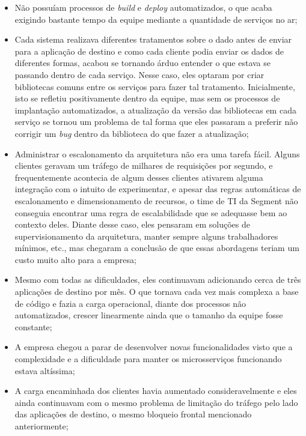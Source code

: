\begin{itemize}
    \item Não possuíam processos de \textit{build} e \textit{deploy} automatizados, o que acaba
        exigindo bastante tempo da equipe mediante a quantidade de serviços no ar;
    \item Cada sistema realizava diferentes tratamentos sobre o dado antes de enviar para a
        aplicação de destino e como cada cliente podia enviar os dados de diferentes formas, acabou
        se tornando árduo entender o que estava se passando dentro de cada serviço. Nesse caso, eles
        optaram por criar bibliotecas comuns entre os serviços para fazer tal tratamento.
        Inicialmente, isto se refletiu positivamente dentro da equipe, mas sem os processos de
        implantação automatizados, a atualização da versão das bibliotecas em cada serviço se tornou
        um problema de tal forma que eles passaram a preferir não corrigir um \textit{bug} dentro da
        biblioteca do que fazer a atualização;
    \item Administrar o escalonamento da arquitetura não era uma tarefa fácil. Alguns clientes
        geravam um tráfego de milhares de requisições por segundo, e frequentemente acontecia de
        algum desses clientes ativarem alguma integração com o intuito de experimentar, e apesar das regras
        automáticas de escalonamento e dimensionamento de recursos, o time de \gls{TI} da Segment
        não conseguia encontrar uma regra de escalabilidade que se adequasse bem ao contexto deles.
        Diante desse caso, eles pensaram em soluções de supervisionamento da arquitetura, manter
        sempre alguns trabalhadores mínimos, etc., mas chegaram a conclusão de que essas abordagens
        teriam um custo muito alto para a empresa;
    \item Mesmo com todas as dificuldades, eles continuavam adicionando cerca de três aplicações de
        destino por mês. O que tornava cada vez mais complexa a base de código e fazia a carga
        operacional, diante dos processos não automatizados, crescer linearmente ainda que o tamanho
        da equipe fosse constante;
    \item A empresa chegou a parar de desenvolver novas funcionalidades visto que a complexidade e a
        dificuldade para manter os microsserviços funcionando estava altíssima;
    \item A carga encaminhada dos clientes havia aumentado consideravelmente e eles ainda
        continuavam com o mesmo problema de limitação do tráfego pelo lado das aplicações de
        destino, o mesmo bloqueio frontal mencionado anteriormente;
\end{itemize}

